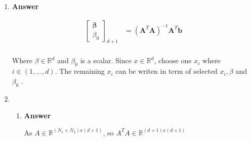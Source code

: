 \documentclass[11pt]{article}
\begin{document}
\begin{enumerate}[label=(\alph*)]

\item  \textbf{Answer}

\begin{align*}
\begin{bmatrix}
\mathbf{\beta} \\ \beta_0
\end{bmatrix}_{d+1}  
 &= (\mathbf{A}^T \mathbf{A} )^{-1}\mathbf{A}^T \mathbf{b}  \\
\end{align*}

Where $\beta \in \mathbb{R}^{d}$ and $\beta_0$ is a scalar. Since $x \in \mathbb{R}^{d}$, choose one $x_i$  where $ i \in (1,...,d)$. 
The remaining $x_i$ can be writen in term of selected $x_i, \beta$ and $\beta_0$ . 

\item

\begin{enumerate}[label=(\roman*)]

\item  \textbf{Answer}

As $A \in \mathbb{R}^{(N_1+N_2)x(d+1)}$, so $A^TA \in \mathbb{R}^{(d+1)x(d+1)}$


\end{enumerate}
\end{enumerate}
\end{document}
